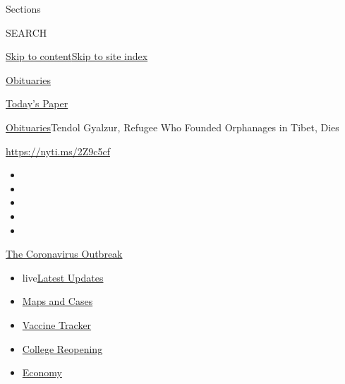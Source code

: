 Sections

SEARCH

\protect\hyperlink{site-content}{Skip to
content}\protect\hyperlink{site-index}{Skip to site index}

\href{https://www.nytimes.com/section/obituaries}{Obituaries}

\href{https://myaccount.nytimes.com/auth/login?response_type=cookie\&client_id=vi}{}

\href{https://www.nytimes.com/section/todayspaper}{Today's Paper}

\href{/section/obituaries}{Obituaries}\textbar{}Tendol Gyalzur, Refugee
Who Founded Orphanages in Tibet, Dies

\url{https://nyti.ms/2Z9c5cf}

\begin{itemize}
\item
\item
\item
\item
\item
\end{itemize}

\href{https://www.nytimes.com/news-event/coronavirus?action=click\&pgtype=Article\&state=default\&region=TOP_BANNER\&context=storylines_menu}{The
Coronavirus Outbreak}

\begin{itemize}
\tightlist
\item
  live\href{https://www.nytimes.com/2020/08/03/world/coronavirus-covid-19.html?action=click\&pgtype=Article\&state=default\&region=TOP_BANNER\&context=storylines_menu}{Latest
  Updates}
\item
  \href{https://www.nytimes.com/interactive/2020/us/coronavirus-us-cases.html?action=click\&pgtype=Article\&state=default\&region=TOP_BANNER\&context=storylines_menu}{Maps
  and Cases}
\item
  \href{https://www.nytimes.com/interactive/2020/science/coronavirus-vaccine-tracker.html?action=click\&pgtype=Article\&state=default\&region=TOP_BANNER\&context=storylines_menu}{Vaccine
  Tracker}
\item
  \href{https://www.nytimes.com/2020/08/02/us/covid-college-reopening.html?action=click\&pgtype=Article\&state=default\&region=TOP_BANNER\&context=storylines_menu}{College
  Reopening}
\item
  \href{https://www.nytimes.com/live/2020/08/03/business/stock-market-today-coronavirus?action=click\&pgtype=Article\&state=default\&region=TOP_BANNER\&context=storylines_menu}{Economy}
\end{itemize}


